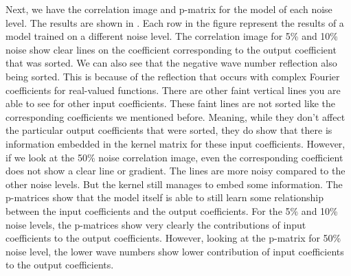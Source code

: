 \documentclass[preprint,12pt,times,authoryear]{elsarticle}
\begin{document}
Next, we have the correlation image and p-matrix for the model of each noise level. The results are shown in . Each row in the figure represent the results of a model trained on a different noise level. The correlation image for 5\% and 10\% noise show clear lines on the coefficient corresponding to the output coefficient that was sorted. We can also see that the negative wave number reflection also being sorted. This is because of the reflection that occurs with complex Fourier coefficients for real-valued functions. There are other faint vertical lines you are able to see for other input coefficients. These faint lines are not sorted like the corresponding coefficients we mentioned before. Meaning, while they don't affect the particular output coefficients that were sorted, they do show that there is information embedded in the kernel matrix for these input coefficients. However, if we look at the 50\% noise correlation image, even the corresponding coefficient does not show a clear line or gradient. The lines are more noisy compared to the other noise levels. But the kernel still manages to embed some information. The p-matrices show that the model itself is able to still learn some relationship between the input coefficients and the output coefficients. For the 5\% and 10\% noise levels, the p-matrices show very clearly the contributions of input coefficients to the output coefficients. However, looking at the p-matrix for 50\% noise level, the lower wave numbers show lower contribution of input coefficients to the output coefficients.
\end{document}

